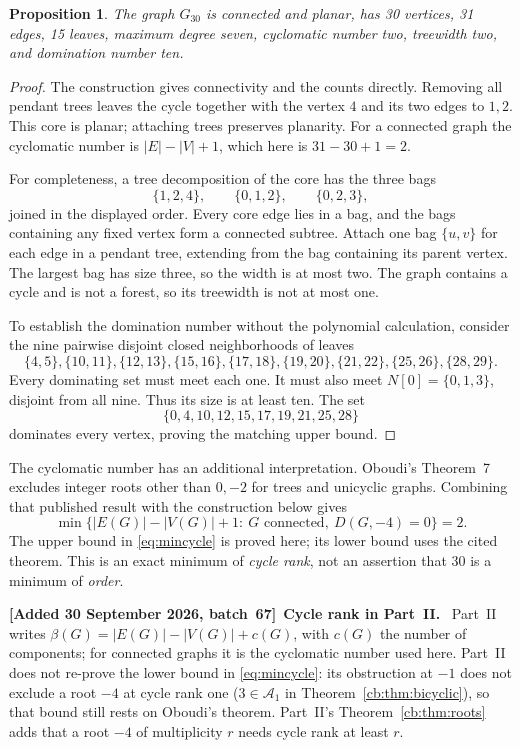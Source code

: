 \documentclass[11pt]{article}
\numberwithin{equation}{section}
\newtheorem{proposition}[theorem]{Proposition}
\theoremstyle{definition}
\newenvironment{writenote}[1][]{\par\smallskip\begingroup\small\sloppy
 \noindent\textbf{[Added 30 September 2026, batch~67]}\if\relax\detokenize{#1}\relax\else~\textbf{#1.}\fi\ }%
 {\par\endgroup\smallskip}
\newcommand{\D}{D}
\newcommand{\Gthirty}{G_{30}}
\begin{document}
\begin{proposition}\label{prop:invariants}
The graph \(\Gthirty\) is connected and planar, has 30 vertices, 31 edges,
15 leaves, maximum degree seven, cyclomatic number two, treewidth two,
and domination number ten.
\end{proposition}
\begin{proof}
The construction gives connectivity and the counts directly. Removing
all pendant trees leaves the cycle together with the vertex \(4\) and
its two edges to \(1,2\). This core is planar; attaching trees preserves
planarity. For a connected graph the cyclomatic number is \(|E|-|V|+1\),
which here is \(31-30+1=2\).

For completeness, a tree decomposition of the core has the three bags
\[
 \{1,2,4\},\qquad \{0,1,2\},\qquad \{0,2,3\},
\]
joined in the displayed order. Every core edge lies in a bag, and the
bags containing any fixed vertex form a connected subtree. Attach one
bag \(\{u,v\}\) for each edge in a pendant tree, extending from the bag
containing its parent vertex. The largest bag has size three, so the
width is at most two. The graph contains a cycle and is not a forest,
so its treewidth is not at most one.

To establish the domination number without the polynomial calculation,
consider the nine pairwise disjoint closed neighborhoods of leaves
\[
 \{4,5\},\{10,11\},\{12,13\},\{15,16\},\{17,18\},
 \{19,20\},\{21,22\},\{25,26\},\{28,29\}.
\]
Every dominating set must meet each one. It must also meet
\(N[0]=\{0,1,3\}\), disjoint from all nine. Thus its size is at least ten.
The set
\[
 \{0,4,10,12,15,17,19,21,25,28\}
\]
dominates every vertex, proving the matching upper bound.
\end{proof}

The cyclomatic number has an additional interpretation. Oboudi's
Theorem~7 \cite{Oboudi} excludes integer roots other than \(0,-2\) for
trees and unicyclic graphs. Combining that published result with the
construction below gives
\begin{equation}\label{eq:mincycle}
\min\{|E(G)|-|V(G)|+1:\ G\text{ connected},\ \D(G,-4)=0\}=2.
\end{equation}
The upper bound in \eqref{eq:mincycle} is proved here; its lower bound
uses the cited theorem. This is an exact minimum of \emph{cycle rank},
not an assertion that 30 is a minimum of \emph{order}.

\begin{writenote}[Cycle rank in Part~II]
Part~II writes \(\beta(G)=|E(G)|-|V(G)|+c(G)\), with \(c(G)\) the number of
components; for connected graphs it is the cyclomatic number used here.
Part~II does not re-prove the lower bound in \eqref{eq:mincycle}: its
obstruction at \(-1\) does not exclude a root \(-4\) at cycle rank one
(\(3\in\mathcal A_1\) in Theorem~\ref{cb:thm:bicyclic}), so that bound
still rests on Oboudi's theorem. Part~II's
Theorem~\ref{cb:thm:roots} adds that a root \(-4\) of multiplicity \(r\)
needs cycle rank at least \(r\).
\end{writenote}
\end{document}
